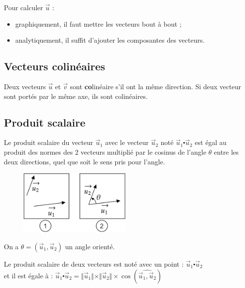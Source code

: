 \documentclass[
	11pt, %
	fleqn, %
	a4paper, %
]{LegrandOrangeBook}
\begin{document}
Pour calculer $\Vec{u}$ :
\begin{itemize}
    \item graphiquement, il faut mettre les vecteurs bout à bout ;
    \item analytiquement, il suffit d’ajouter les composantes des vecteurs.
\end{itemize}


\subsection*{Vecteurs colinéaires}

Deux vecteurs $\Vec{u}$ et $\Vec{v}$ sont \textbf{co}linéaire s'il ont la même direction. Si deux vecteur sont portés par le même axe, ils sont colinéaires. 




\subsection{Produit scalaire}

Le produit scalaire du vecteur $\Vec{u}_1$ avec le vecteur $\Vec{u}_2$ noté $\Vec{u}_1 \centerdot \Vec{u}_2$ est égal au produit des normes des 2
vecteurs multiplié par le cosinus de l’angle $\theta$ entre les deux directions, quel que soit le sens pris pour l’angle.

\begin{figure}[H] %
	\centering %
	\includegraphics[width=0.5\textwidth]{Images/sca1.png} %
\end{figure}
On a $\theta = (\Vec{u}_1, \Vec{u}_2)$ un angle orienté.
\begin{definition}
    Le produit scalaire de deux vecteurs est noté avec un point : $\Vec{u}_1 \centerdot \Vec{u}_2$ \\
    et il est égale à : $\Vec{u}_1 \centerdot \Vec{u}_2 = \Vert \Vec{u}_1 \Vert \times \Vert \Vec{u}_2 \Vert \times \cos ( \widehat{\Vec{u}_1, \Vec{u}_2 } )$
    
\end{definition}
\end{document}
